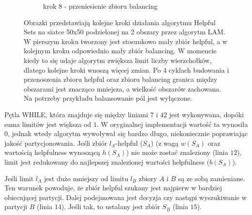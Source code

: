 \begin{figure}[h]
\begin{subfigure}{.5\textwidth}
    \caption[short]{krok 8 - przeniesienie zbioru balancing}
\end{subfigure}
\caption{Obrazki przedstawiają kolejne kroki działania algorytmu Helpful Sets na siatce 50x50 podzielonej na 2 obszary
przez algorytm LAM. W pierszym kroku tworzony jest stosunkowo mały zbiór helpful, a w kolejnym kroku odpowiednio mały zbiór balancing.
W momencie kiedy to się udaje algorytm zwiększa limit liczby wierzchołków, dlatego kolejne kroki wnoszą więcej zmian.
Po 4 cyklach budowania i przenoszenia zbioru helpful oraz zbioru balancing granica między obszarami jest znacząco mniejsza, a wielkość obszarów
zachowana. Na potrzeby przykładu balansowanie pól jest wyłączone.}
\label{im:h_steps}
\end{figure}
\FloatBarrier

Pętla WHILE, która znajduje się między liniami $7$ i $42$ jest wykonywana, dopóki suma limitów jest większa od $1$.
W oryginalnej implementacji wartość ta wynosiła $0$, jednak wtedy algorytm wywoływał się bardzo długo,
niekoniecznie poprawiając jakość partycjonowania.
Jeśli zbiór $l_A$-helpful ($S_A$) (z wagą $w(S_A)$ oraz wartością helpfulness wynoszącą $h(S_A)$) nie może zostać
znaleziony (linia $12$), limit jest redukowany do najlepszej znalezionej wartości helpfulness ($b(S_A)$).

Jeśli limit $l_A$ jest dużo mniejszy od limitu $l_B$ zbiory $A$ i $B$ są ze sobą zamieniane.
Ten warunek powoduje, że zbiór helpful szukany jest najpierw w bardziej obiecującej partycji.
Dalej podejmowana jest decyzja czy nastąpi wyszukiwanie w partycji $B$ (linia $14$).
Jeśli tak, to ustalany jest zbiór $S_B$ (linia $15$).


